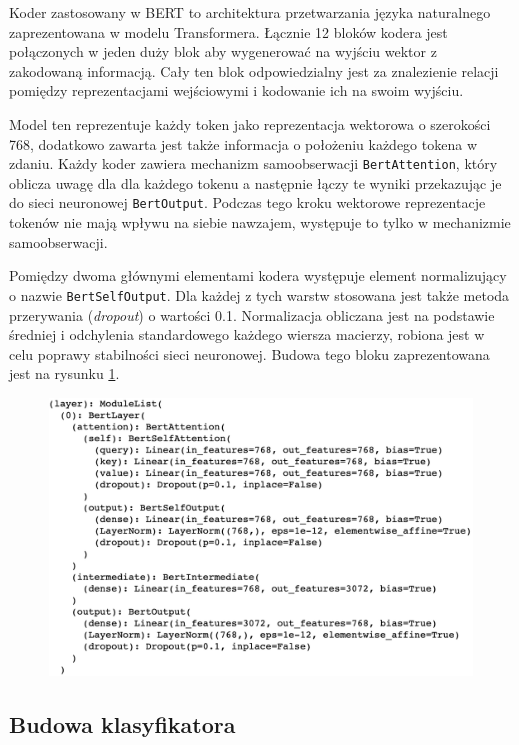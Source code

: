 Koder zastosowany w BERT to architektura przetwarzania języka naturalnego zaprezentowana w modelu Transformera. Łącznie 12 bloków kodera jest połączonych w jeden duży blok aby wygenerować na wyjściu wektor z zakodowaną informacją. Cały ten blok odpowiedzialny jest za znalezienie relacji pomiędzy reprezentacjami wejściowymi i kodowanie ich na swoim wyjściu.

Model ten reprezentuje każdy token jako reprezentacja wektorowa o szerokości 768, dodatkowo zawarta jest także informacja o położeniu każdego tokena w zdaniu. Każdy koder zawiera mechanizm samoobserwacji \texttt{BertAttention}, który oblicza uwagę dla dla każdego tokenu a następnie łączy te wyniki przekazując je do sieci neuronowej \texttt{BertOutput}. Podczas tego kroku wektorowe reprezentacje tokenów nie mają wpływu na siebie nawzajem, występuje to tylko w mechanizmie samoobserwacji.

Pomiędzy dwoma głównymi elementami kodera występuje element normalizujący o nazwie \texttt{BertSelfOutput}. Dla każdej z tych warstw stosowana jest także metoda przerywania (\textit{dropout}) o wartości 0.1. Normalizacja obliczana jest na podstawie średniej i odchylenia standardowego każdego wiersza macierzy, robiona jest w celu poprawy stabilności sieci neuronowej. Budowa tego bloku zaprezentowana jest na rysunku \ref{rys:bert_layer}.

\begin{figure}[t]
\centering\includegraphics[width=12cm]{figures/reports/bert_layer.png}
\label{rys:bert_layer}
\end{figure}

\subsection{Budowa klasyfikatora}

